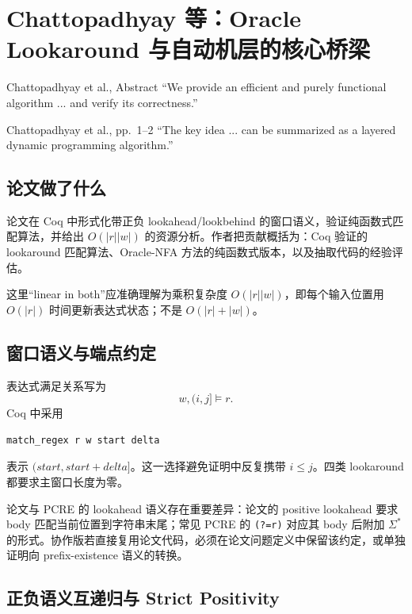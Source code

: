 \documentclass[UTF8,a4paper,12pt]{ctexart}
\begin{document}
\section{Chattopadhyay 等：Oracle Lookaround 与自动机层的核心桥梁}

\begin{paperquote}{Chattopadhyay et al., Abstract}
``We provide an efficient and purely functional algorithm ... and verify its correctness.''
\end{paperquote}

\begin{paperquote}{Chattopadhyay et al., pp.~1--2}
``The key idea ... can be summarized as a layered dynamic programming algorithm.''
\end{paperquote}

\subsection{论文做了什么}

论文在 Coq 中形式化带正负 lookahead/lookbehind 的窗口语义，验证纯函数式匹配算法，并给出 $O(|r||w|)$ 的资源分析。作者把贡献概括为：Coq 验证的 lookaround 匹配算法、Oracle-NFA 方法的纯函数式版本，以及抽取代码的经验评估\cite[pp.~1--2]{chattopadhyay2025}。

这里“linear in both”应准确理解为乘积复杂度 $O(|r||w|)$，即每个输入位置用 $O(|r|)$ 时间更新表达式状态；不是 $O(|r|+|w|)$。

\subsection{窗口语义与端点约定}

表达式满足关系写为
\[
w,(i,j]\models r.
\]
Coq 中采用
\begin{lstlisting}
match_regex r w start delta
\end{lstlisting}
表示 $(start,start+delta]$。这一选择避免证明中反复携带 $i\le j$。四类 lookaround 都要求主窗口长度为零。

论文与 PCRE 的 lookahead 语义存在重要差异：论文的 positive lookahead 要求 body 匹配当前位置到字符串末尾；常见 PCRE 的 \texttt{(?=r)} 对应其 body 后附加 $\Sigma^*$ 的形式\cite[p.~3]{chattopadhyay2025}。协作版若直接复用论文代码，必须在论文问题定义中保留该约定，或单独证明向 prefix-existence 语义的转换。

\subsection{正负语义互递归与 Strict Positivity}
\end{document}
